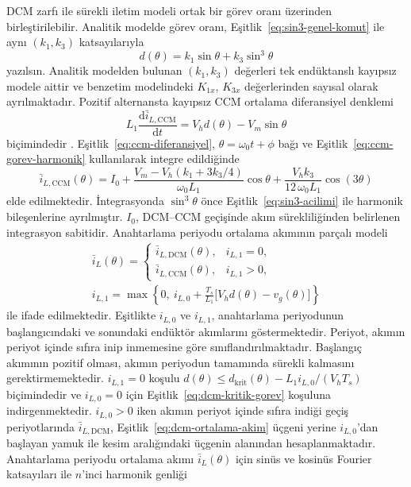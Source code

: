 DCM zarfı ile sürekli iletim modeli ortak bir görev oranı üzerinden birleştirilebilir. Analitik modelde görev oranı, Eşitlik~\eqref{eq:sin3-genel-komut} ile aynı $(k_1,k_3)$ katsayılarıyla
\begin{equation}
  d(\theta)=k_1\sin\theta+k_3\sin^3\theta
  \label{eq:ccm-gorev-harmonik}
\end{equation}
yazılsın. Analitik modelden bulunan $(k_1,k_3)$ değerleri tek endüktanslı kayıpsız modele aittir ve benzetim modelindeki $K_{1x}$, $K_{3x}$ değerlerinden sayısal olarak ayrılmaktadır. Pozitif alternansta kayıpsız CCM ortalama diferansiyel denklemi
\begin{equation}
  L_1\frac{\mathrm{d}\bar i_{L,\mathrm{CCM}}}{\mathrm{d}t}
  =V_h d(\theta)-V_m\sin\theta
  \label{eq:ccm-diferansiyel}
\end{equation}
biçimindedir \citep{Erickson2001,Mohan2003}. Eşitlik~\eqref{eq:ccm-diferansiyel}, $\theta=\omega_0t+\phi$ bağı ve Eşitlik~\eqref{eq:ccm-gorev-harmonik} kullanılarak integre edildiğinde
\begin{equation}
  \bar i_{L,\mathrm{CCM}}(\theta)
  = I_0+\frac{V_m-V_h\left(k_1+3k_3/4\right)}{\omega_0L_1}\cos\theta
  +\frac{V_hk_3}{12\,\omega_0L_1}\cos(3\theta)
  \label{eq:ccm-akim-cozumu}
\end{equation}
elde edilmektedir. İntegrasyonda $\sin^3\theta$ önce Eşitlik~\eqref{eq:sin3-acilimi} ile harmonik bileşenlerine ayrılmıştır. $I_0$, DCM--CCM geçişinde akım sürekliliğinden belirlenen integrasyon sabitidir. Anahtarlama periyodu ortalama akımının parçalı modeli
\begin{equation}
  \begin{gathered}
    \bar i_L(\theta)=
    \begin{cases}
      \bar i_{L,\mathrm{DCM}}(\theta), & i_{L,1}=0,\\
      \bar i_{L,\mathrm{CCM}}(\theta), & i_{L,1}>0,
    \end{cases}\\
    i_{L,1}=\max\left\{0,\ i_{L,0}+\frac{T_s}{L_1}\bigl[V_hd(\theta)-v_g(\theta)\bigr]\right\}
  \end{gathered}
  \label{eq:dcm-ccm-parcali-model}
\end{equation}
ile ifade edilmektedir. Eşitlikte $i_{L,0}$ ve $i_{L,1}$, anahtarlama periyodunun başlangıcındaki ve sonundaki endüktör akımlarını göstermektedir. Periyot, akımın periyot içinde sıfıra inip inmemesine göre sınıflandırılmaktadır. Başlangıç akımının pozitif olması, akımın periyodun tamamında sürekli kalmasını gerektirmemektedir. $i_{L,1}=0$ koşulu $d(\theta)\leq d_{\mathrm{krit}}(\theta)-L_1i_{L,0}/(V_hT_s)$ biçimindedir ve $i_{L,0}=0$ için Eşitlik~\eqref{eq:dcm-kritik-gorev} koşuluna indirgenmektedir. $i_{L,0}>0$ iken akımın periyot içinde sıfıra indiği geçiş periyotlarında $\bar i_{L,\mathrm{DCM}}$, Eşitlik~\eqref{eq:dcm-ortalama-akim} üçgeni yerine $i_{L,0}$'dan başlayan yamuk ile kesim aralığındaki üçgenin alanından hesaplanmaktadır. Anahtarlama periyodu ortalama akımı $\bar i_L(\theta)$ için sinüs ve kosinüs Fourier katsayıları ile $n$'inci harmonik genliği
